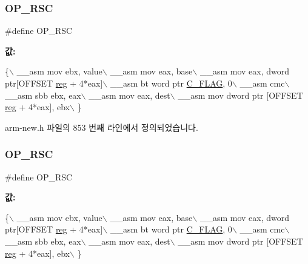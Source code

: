 \subsubsection{\texorpdfstring{O\+P\+\_\+\+R\+SC}{OP\_RSC}\hspace{0.1cm}{\footnotesize\ttfamily [1/2]}}
{\footnotesize\ttfamily \#define O\+P\+\_\+\+R\+SC}

{\bfseries 값\+:}
\begin{DoxyCode}
\{\(\backslash\)
        \_\_asm mov ebx, value\(\backslash\)
        \_\_asm mov eax, base\(\backslash\)
        \_\_asm mov eax, dword ptr[OFFSET \mbox{\hyperlink{_g_b_a_8h_ae29faba89509024ffd1a292badcedf2d}{reg}} + 4*eax]\(\backslash\)
        \_\_asm bt word ptr \mbox{\hyperlink{_g_b_8h_aa29c80f7f7f901ec7a2c57887f56585d}{C\_FLAG}}, 0\(\backslash\)
        \_\_asm cmc\(\backslash\)
        \_\_asm sbb ebx, eax\(\backslash\)
        \_\_asm mov eax, dest\(\backslash\)
        \_\_asm mov dword ptr [OFFSET \mbox{\hyperlink{_g_b_a_8h_ae29faba89509024ffd1a292badcedf2d}{reg}} + 4*eax], ebx\(\backslash\)
      \}
\end{DoxyCode}


arm-\/new.\+h 파일의 853 번째 라인에서 정의되었습니다.

\mbox{\label{_g_b_a_8cpp_a1ded477d09f3387120843cc98f2aa147}} 
\subsubsection{\texorpdfstring{O\+P\+\_\+\+R\+SC}{OP\_RSC}\hspace{0.1cm}{\footnotesize\ttfamily [2/2]}}
{\footnotesize\ttfamily \#define O\+P\+\_\+\+R\+SC}

{\bfseries 값\+:}
\begin{DoxyCode}
\{\(\backslash\)
        \_\_asm mov ebx, value\(\backslash\)
        \_\_asm mov eax, base\(\backslash\)
        \_\_asm mov eax, dword ptr[OFFSET \mbox{\hyperlink{_g_b_a_8h_ae29faba89509024ffd1a292badcedf2d}{reg}} + 4*eax]\(\backslash\)
        \_\_asm bt word ptr \mbox{\hyperlink{_g_b_8h_aa29c80f7f7f901ec7a2c57887f56585d}{C\_FLAG}}, 0\(\backslash\)
        \_\_asm cmc\(\backslash\)
        \_\_asm sbb ebx, eax\(\backslash\)
        \_\_asm mov eax, dest\(\backslash\)
        \_\_asm mov dword ptr [OFFSET \mbox{\hyperlink{_g_b_a_8h_ae29faba89509024ffd1a292badcedf2d}{reg}} + 4*eax], ebx\(\backslash\)
      \}
\end{DoxyCode}
\mbox{\label{arm-new_8h_a2c5590f712403b7ef57c57de43662185}} 
